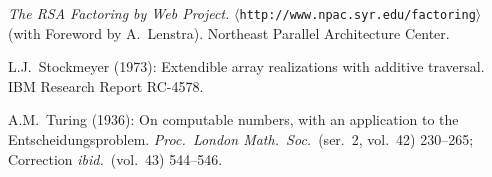 \begin{thebibliography}{99}
{\it The RSA Factoring by Web Project.}
$\langle${\tt http://www.npac.syr.edu/factoring}$\rangle$ (with
Foreword by A.~Lenstra).  Northeast Parallel Architecture Center.

L.J.~Stockmeyer (1973): Extendible array realizations with additive
traversal.  IBM Research Report RC-4578.

A.M.~Turing (1936): On computable numbers, with an application to the
Entscheidungsproblem.  {\it Proc.~London Math.~Soc.}~(ser.~2, vol.~42)
230--265; Correction {\it ibid.}~(vol.~43) 544--546.
\end{thebibliography}


